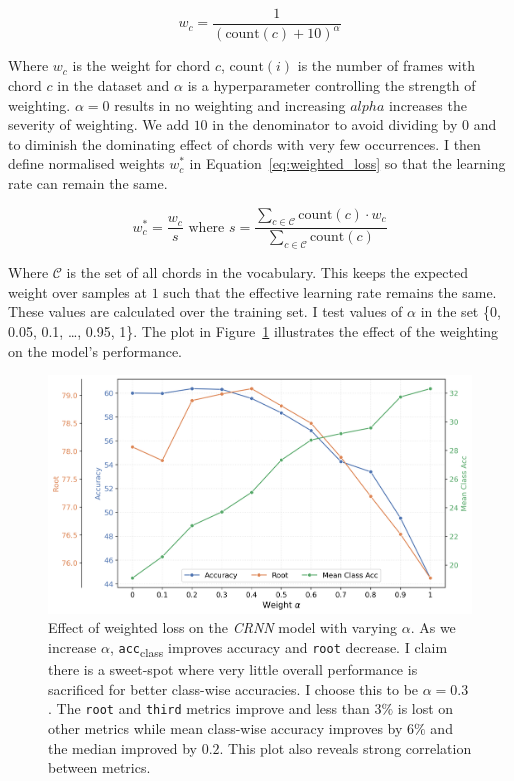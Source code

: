 \begin{equation}\label{eq:weighting}
    w_c = \frac{1}{{(\text{count}(c) + 10)}^\alpha}
\end{equation}

Where $w_c$ is the weight for chord $c$, $\text{count}(i)$ is the number of frames with chord $c$ in the dataset and $\alpha$ is a hyperparameter controlling the strength of weighting. $\alpha=0$ results in no weighting and increasing $alpha$ increases the severity of weighting. We add $10$ in the denominator to avoid dividing by $0$ and to diminish the dominating effect of chords with very few occurrences. I then define normalised weights $w_c^*$ in Equation~\ref{eq:weighted_loss} so that the learning rate can remain the same.

\begin{equation}\label{eq:weighted_loss}
    w_c^* = \frac{w_c}{s} \text{ where } s = \frac{\sum_{c\in \mathcal{C}} \text{count}(c)\cdot w_c}{\sum_{c\in \mathcal{C}} \text{count}(c)}
\end{equation}

Where $\mathcal{C}$ is the set of all chords in the vocabulary. This keeps the expected weight over samples at $1$ such that the effective learning rate remains the same. These values are calculated over the training set. I test values of $\alpha$ in the set \{0, 0.05, 0.1, \ldots, 0.95, 1\}. The plot in Figure~\ref{fig:weighted_loss} illustrates the effect of the weighting on the model's performance.

\begin{figure}[H]
    \centering
    \includegraphics[width=1.0\textwidth]{figures/weight_alpha_search_trim.png}
    \caption{Effect of weighted loss on the \emph{CRNN} model with varying $\alpha$. As we increase $\alpha$, \texttt{acc}\textsubscript{class} improves accuracy and \texttt{root} decrease. I claim there is a sweet-spot where very little overall performance is sacrificed for better class-wise accuracies. I choose this to be $\alpha = 0.3$. The \texttt{root} and \texttt{third} metrics improve and less than $3\%$ is lost on other metrics while mean class-wise accuracy improves by $6\%$ and the median improved by $0.2$. This plot also reveals strong correlation between metrics. }\label{fig:weighted_loss}
\end{figure}

